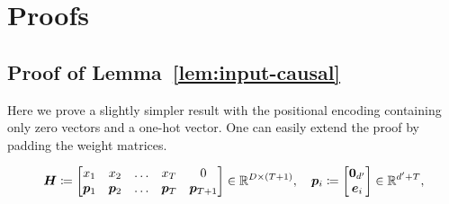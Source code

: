 
\clearpage

\section{Proofs}\label{sec:proofs}
\subsection{Proof of Lemma~\ref{lem:input-causal}}\label{proof:lem-input-casual}
Here we prove a slightly simpler result with the positional encoding containing only zero vectors and a one-hot vector.
One can easily extend the proof by padding the weight matrices.

\begin{equation}\label{eqn:input-data2}
    \boldsymbol{H} 
    \coloneqq
    \begin{bmatrix}
        x_1 & x_2 &  \dots & x_T & 0
        \\
        \bm{p}_1 & \bm{p}_2 & \dots & \bm{p}_T &
        \bm{p}_{T+1}
    \end{bmatrix}
    \in \mathbb{R}^{D \times (T+1)}
    ,
    \quad
    \bm{p}_i
    \coloneqq
    \begin{bmatrix}
        \mathbf{0}_{d^\prime}
        \\
        \bm{e}_i
    \end{bmatrix}
    \in \mathbb{R}^{d^\prime + T}
    ,
\end{equation}

